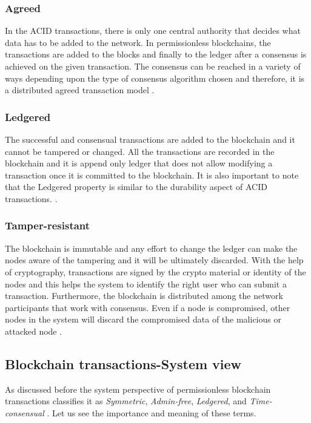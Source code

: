 \documentclass[
  a4paper,  %
  twoside,  %
  bibliography=totoc,
  headsepline,
  cleardoublepage=empty,
  parskip=half,
  draft=false
]{scrbook}
\begin{document}
\subsubsection{Agreed}
In the ACID transactions, there is only one central authority that decides what data has to be added to the network. In permissionless blockchains, the transactions are added to the blocks and finally to the ledger after a consensus is achieved on the given transaction. The consensus can be reached in a variety of ways depending upon the type of consensus algorithm chosen and therefore, it is a distributed agreed transaction model \cite{Salt}.

\subsubsection{Ledgered}
The successful and consensual transactions are added to the blockchain and it cannot be tampered or changed. All the transactions are recorded in the blockchain and it is append only ledger that does not allow modifying a transaction once it is committed to the blockchain. It is also important to note that the Ledgered property is similar to the durability aspect of ACID transactions. \cite{Salt}.

\subsubsection{Tamper-resistant}
The blockchain is immutable and any effort to change the ledger can make the nodes aware of the tampering and it will be ultimately discarded. With the help of cryptography, transactions are signed by the crypto material or identity of the nodes and this helps the system to identify the right user who can submit a transaction. Furthermore, the blockchain is distributed among the network participants that work with consensus. Even if a node is compromised, other nodes in the system will discard the compromised data of the malicious or attacked node \cite{Salt}.

\subsection{Blockchain transactions-System view}
As discussed before the system perspective of permissionless blockchain transactions classifies it as \textit{Symmetric}, \textit{Admin-free}, \textit{Ledgered}, and \textit{Time-consensual} \cite{Salt}. Let us see the importance and meaning of these terms.
\end{document}
